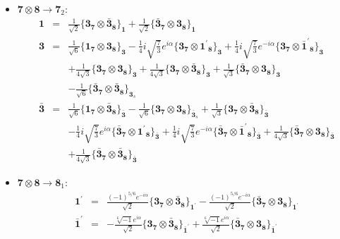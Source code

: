 \documentclass[english]{article}
\newcommand{\subcg}[3]{\big\{ {#1}\otimes{#2}\big\}^{}_{#3}}
\newcommand{\rep}[1]{\mathbf{#1}}
\begin{document}
\begin{itemize}
\begin{eqnarray*}
\end{eqnarray*}
\item $\rep{7}\otimes\rep{8}\to\rep{7}_{2}$:
\begin{eqnarray*}
\rep{1} &=& \frac{1}{\sqrt{2}}\subcg{\rep{3}_{\rep{7}}}{\rep{\bar{3}}_{\rep{8}}}{\rep{1}}+\frac{1}{\sqrt{2}}\subcg{\rep{\bar{3}}_{\rep{7}}}{\rep{3}_{\rep{8}}}{\rep{1}}
\\
\rep{3} &=& \frac{1}{\sqrt{6}}\subcg{\rep{1}_{\rep{7}}}{\rep{3}_{\rep{8}}}{\rep{3}}-\frac{1}{4} i \sqrt{\frac{7}{3}} e^{i \alpha }\subcg{\rep{3}_{\rep{7}}}{\rep{1^{\prime}}_{\rep{8}}}{\rep{3}}+\frac{1}{4} i \sqrt{\frac{7}{3}} e^{-i \alpha }\subcg{\rep{3}_{\rep{7}}}{\rep{\bar{1}^{\prime}}_{\rep{8}}}{\rep{3}} \\ 
 & & +\frac{1}{4 \sqrt{3}}\subcg{\rep{3}_{\rep{7}}}{\rep{3}_{\rep{8}}}{\rep{3}}+\frac{1}{4 \sqrt{3}}\subcg{\rep{3}_{\rep{7}}}{\rep{\bar{3}}_{\rep{8}}}{\rep{3}}+\frac{1}{\sqrt{3}}\subcg{\rep{\bar{3}}_{\rep{7}}}{\rep{3}_{\rep{8}}}{\rep{3}} \\ 
 & & -\frac{1}{\sqrt{6}}\subcg{\rep{\bar{3}}_{\rep{7}}}{\rep{\bar{3}}_{\rep{8}}}{\rep{3}_{s}}
\\
\rep{\bar{3}} &=& \frac{1}{\sqrt{6}}\subcg{\rep{1}_{\rep{7}}}{\rep{\bar{3}}_{\rep{8}}}{\rep{\bar{3}}}-\frac{1}{\sqrt{6}}\subcg{\rep{3}_{\rep{7}}}{\rep{3}_{\rep{8}}}{\rep{\bar{3}}_{s}}+\frac{1}{\sqrt{3}}\subcg{\rep{3}_{\rep{7}}}{\rep{\bar{3}}_{\rep{8}}}{\rep{\bar{3}}} \\ 
 & & -\frac{1}{4} i \sqrt{\frac{7}{3}} e^{i \alpha }\subcg{\rep{\bar{3}}_{\rep{7}}}{\rep{1^{\prime}}_{\rep{8}}}{\rep{\bar{3}}}+\frac{1}{4} i \sqrt{\frac{7}{3}} e^{-i \alpha }\subcg{\rep{\bar{3}}_{\rep{7}}}{\rep{\bar{1}^{\prime}}_{\rep{8}}}{\rep{\bar{3}}}+\frac{1}{4 \sqrt{3}}\subcg{\rep{\bar{3}}_{\rep{7}}}{\rep{3}_{\rep{8}}}{\rep{\bar{3}}} \\ 
 & & +\frac{1}{4 \sqrt{3}}\subcg{\rep{\bar{3}}_{\rep{7}}}{\rep{\bar{3}}_{\rep{8}}}{\rep{\bar{3}}}
\end{eqnarray*}
\item $\rep{7}\otimes\rep{8}\to\rep{8}_{1}$:
\begin{eqnarray*}
\rep{1^{\prime}} &=& \frac{(-1)^{5/6} e^{-i \alpha }}{\sqrt{2}}\subcg{\rep{3}_{\rep{7}}}{\rep{\bar{3}}_{\rep{8}}}{\rep{1^{\prime}}}-\frac{(-1)^{5/6} e^{-i \alpha }}{\sqrt{2}}\subcg{\rep{\bar{3}}_{\rep{7}}}{\rep{3}_{\rep{8}}}{\rep{1^{\prime}}}
\\
\rep{\bar{1}^{\prime}} &=& -\frac{\sqrt[6]{-1} e^{i \alpha }}{\sqrt{2}}\subcg{\rep{3}_{\rep{7}}}{\rep{\bar{3}}_{\rep{8}}}{\rep{\bar{1}^{\prime}}}+\frac{\sqrt[6]{-1} e^{i \alpha }}{\sqrt{2}}\subcg{\rep{\bar{3}}_{\rep{7}}}{\rep{3}_{\rep{8}}}{\rep{\bar{1}^{\prime}}}

\end{eqnarray*}
\end{itemize}
\end{document}
